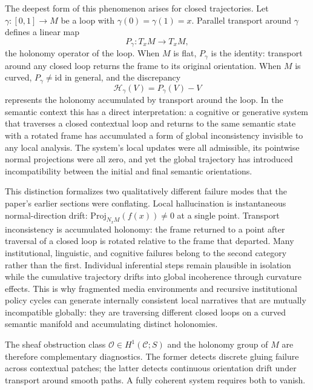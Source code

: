 \documentclass[11pt,a4paper,twocolumn]{article}
\begin{document}
The deepest form of this phenomenon arises for closed trajectories.
Let $\gamma : [0,1] \to M$ be a loop with $\gamma(0) = \gamma(1) = x$.
Parallel transport around $\gamma$ defines a linear map
\[
P_\gamma : T_x M \to T_x M,
\]
the holonomy operator of the loop. When $M$ is flat, $P_\gamma$ is the
identity: transport around any closed loop returns the frame to its
original orientation. When $M$ is curved, $P_\gamma \neq \mathrm{id}$
in general, and the discrepancy
\[
\mathcal{H}_\gamma(V) = P_\gamma(V) - V
\]
represents the holonomy accumulated by transport around the loop.
In the semantic context this has a direct interpretation: a cognitive
or generative system that traverses a closed contextual loop and
returns to the same semantic state with a rotated frame has
accumulated a form of global inconsistency invisible to any local
analysis. The system's local updates were all admissible, its pointwise
normal projections were all zero, and yet the global trajectory has
introduced incompatibility between the initial and final semantic
orientations.

This distinction formalizes two qualitatively different failure modes
that the paper's earlier sections were conflating. Local hallucination
is instantaneous normal-direction drift: $\mathrm{Proj}_{N_x M}(f(x))
\neq 0$ at a single point. Transport inconsistency is accumulated
holonomy: the frame returned to a point after traversal of a closed
loop is rotated relative to the frame that departed. Many
institutional, linguistic, and cognitive failures belong to the second
category rather than the first. Individual inferential steps remain
plausible in isolation while the cumulative trajectory drifts into
global incoherence through curvature effects. This is why fragmented
media environments and recursive institutional policy cycles can
generate internally consistent local narratives that are mutually
incompatible globally: they are traversing different closed loops on a
curved semantic manifold and accumulating distinct holonomies.

The sheaf obstruction class $\mathcal{O} \in H^1(\mathcal{C}; S)$
and the holonomy group of $M$ are therefore complementary diagnostics.
The former detects discrete gluing failure across contextual patches;
the latter detects continuous orientation drift under transport around
smooth paths. A fully coherent system requires both to vanish.

\end{document}
